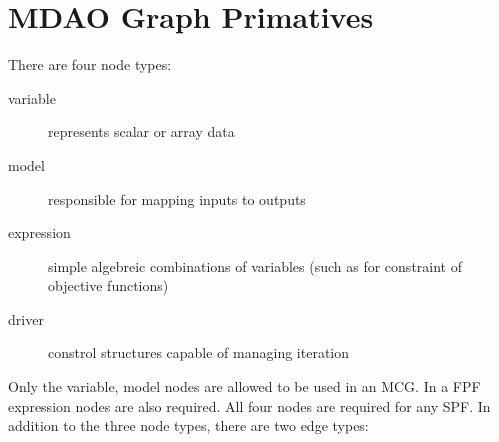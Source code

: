 
\section{MDAO Graph Primatives}
There are four node types:  
\begin{description}
\item[variable] represents scalar or array data
\item[model] responsible for mapping inputs to outputs
\item[expression] simple algebreic combinations of variables (such as for constraint of objective functions)
\item[driver] constrol structures capable of managing iteration
\end{description}

Only the variable, model nodes are allowed to be used in an MCG. In a FPF expression 
nodes are also required. All four nodes are required for any SPF. In addition to 
the three node types, there are two edge types: 


